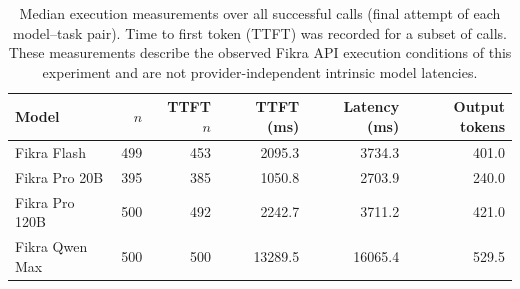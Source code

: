 \begin{table}[t]
\centering
\caption{Median execution measurements over all successful calls (final attempt of each model--task pair). Time to first token (TTFT) was recorded for a subset of calls. These measurements describe the observed Fikra API execution conditions of this experiment and are not provider-independent intrinsic model latencies.}
\label{tab:latency}
\begin{tabular}{lrrrrr}
\toprule
Model & $n$ & TTFT $n$ & TTFT (ms) & Latency (ms) & Output tokens \\
\midrule
Fikra Flash & 499 & 453 & 2095.3 & 3734.3 & 401.0 \\
Fikra Pro 20B & 395 & 385 & 1050.8 & 2703.9 & 240.0 \\
Fikra Pro 120B & 500 & 492 & 2242.7 & 3711.2 & 421.0 \\
Fikra Qwen Max & 500 & 500 & 13289.5 & 16065.4 & 529.5 \\
\bottomrule
\end{tabular}
\end{table}

